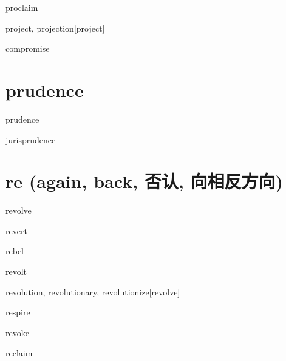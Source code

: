 \begin{RefWord}{proclaim}
\end{RefWord}

\begin{RefWord}{project, projection}[project]
\end{RefWord}

\begin{RefWord}{compromise}
\end{RefWord}

\section{prudence}

\begin{RefWord}{prudence}
\end{RefWord}

\begin{RefWord}{jurisprudence}
\end{RefWord}

\section{re (again, back, 否认, 向相反方向)}

\begin{RefWord}{revolve}
\end{RefWord}

\begin{RefWord}{revert}
\end{RefWord}

\begin{RefWord}{rebel}
\end{RefWord}

\begin{RefWord}{revolt}
\end{RefWord}

\begin{RefWord}{revolution, revolutionary, revolutionize}[revolve]
\end{RefWord}

\begin{RefWord}{respire}
\end{RefWord}

\begin{RefWord}{revoke}
\end{RefWord}

\begin{RefWord}{reclaim}
\end{RefWord}

